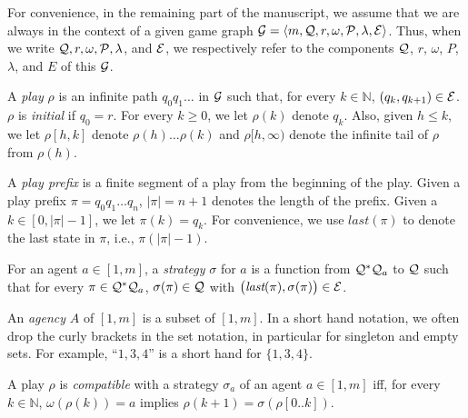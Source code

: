 \documentclass{llncs}
\newcommand{\cale}{{\cal E}}
\newcommand{\calg}{{\cal G}}
\newcommand{\calp}{{\cal P}}
\newcommand{\calq}{{\cal Q}}
\newcommand{\emlast}{\textit{last}}
\newcommand{\nnneg}{{\mathbb N}}
\newenvironment{list1}{\begin{list}{$\bullet$}
{\topsep 0 pt \parsep 0 pt \partopsep 0 pt \itemsep 0 pt}}{\end{list}}
\begin{document}
For convenience, in the remaining part of the 
manuscript, we assume that we are always in the context 
of a given game graph
$\calg=\langle m,\calq,r,\omega,\calp,\lambda,\cale\rangle$.
Thus, when we write $\calq,r,\omega,\calp,\lambda$, and $\cale$, 
we respectively refer to the components $\calq$, $r$, 
$\omega$, $P$, $\lambda$, and $E$ of this $\calg$.  


A {\em play} $\rho$ is an infinite path $q_0 q_1\ldots$ in $\calg$ 
such that, for every $k\in \nnneg$, 
$(q_k,q_{k+1})\in \cale$.  
$\rho$ is {\em initial} if $q_0=r$. 
For every $k\geq 0$, we let $\rho(k)$ denote $q_k$.
Also, given $h\leq k$,
we let $\rho[h,k]$ denote $\rho(h)\ldots\rho(k)$ and
$\rho[h,\infty)$ denote the infinite tail of $\rho$
from $\rho(h)$. 

A {\em play prefix} is a finite segment of a play from the beginning of
the play.  
Given a play prefix $\pi=q_0q_1\ldots q_n$, 
$|\pi|=n+1$ denotes the length of the prefix.
Given a $k\in [0,|\pi|-1]$, we let $\pi(k)=q_k$.  
For convenience, we use $\emlast(\pi)$ to denote the 
last state in $\pi$, i.e., $\pi(|\pi|-1)$.  

For an agent $a\in [1,m]$,
a {\em strategy} $\sigma$ for $a$ is
a function from $\calq^*\calq_a$ to $\calq$ such that
for every $\pi\in \calq^*\calq_a$,
$\sigma(\pi)\in \calq$ with $\big(\emlast(\pi),\sigma(\pi)\big)\in \cale$.

An {\em agency} $A$ of $[1,m]$ is a subset of $[1,m]$.
In a short hand notation, we often drop the curly brackets in the set notation, in particular for singleton and empty sets.
For example, ``$1,3,4$'' is a short hand for $\{1,3,4\}$.

A play $\rho$ is \emph{compatible} with a strategy $\sigma_a$ of an agent $a\in [1,m]$ iff, for every $k\in \mathbb N$, $\omega(\rho(k))=a$ implies $\rho(k+1)=\sigma(\rho[0..k])$.
\end{document}
